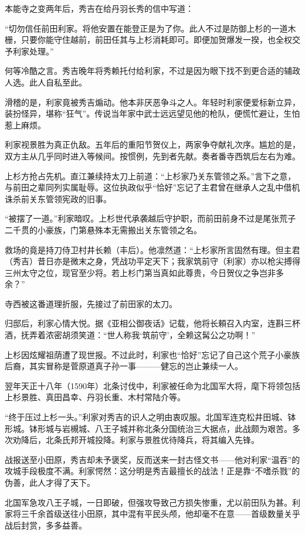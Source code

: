 \documentclass[
]{article}
\begin{document}
本能寺之变两年后，秀吉在给丹羽长秀的信中写道：

``切勿信任前田利家。将他安置在能登正是为了你。此人不过是防御上杉的一道木栅，只要你能守住越前，前田任其与上杉消耗即可。即便加贺爆发一揆，也全权交予利家处理。''

何等冷酷之言。秀吉晚年将秀赖托付给利家，不过是因为眼下找不到更合适的辅政人选。此人自私至此。

滑稽的是，利家竟被秀吉煽动。他本非厌恶争斗之人。年轻时利家便爱标新立异，装扮怪异，堪称``狂气''。传说当年家中武士远远望见他的枪队，便慌忙避让，生怕惹上麻烦。

利家视景胜为真正仇敌。五年后的重阳节贺仪上，两家争夺献礼次序。尴尬的是，双方主从几乎同时进入等候间。按惯例，先到者先献。奏者番寺西筑后左右为难。

上杉方抢占先机。直江兼续持太刀上前道：``上杉家乃关东管领之系。''言下之意，与前田之辈同列实属耻辱。这位执政似乎``恰好''忘记了主君曾在继承人之乱中借机诛杀前关东管领宪政的旧事。

``被摆了一道。''利家暗叹。上杉世代承袭越后守护职，而前田前身不过是尾张荒子二千贯的小豪族，门第悬殊本无需搬出关东管领之名。

救场的竟是持刀侍卫村井长赖（丰后）。他凛然道：``上杉家所言固然有理。但主君（秀吉）昔日亦是微末之身，凭战功平定天下；我家筑前守（利家）亦以枪尖搏得三州太守之位，现官至少将。若上杉门第当真如此尊贵，今日贺仪之争岂非多余？''

寺西被这番道理折服，先接过了前田家的太刀。

归邸后，利家心情大悦。据《亚相公御夜话》记载，他将长頼召入内室，连斟三杯酒，抚弄着浓密胡须笑道：``世人称我`筑前守'，全赖这髯公之功啊！''

上杉因炫耀祖荫遭了现世报。不过此时，利家也``恰好''忘记了自己这个荒子小豪族后裔，其实冒称是菅原道真子孙一事---------健忘的岂止兼续一人。

翌年天正十八年（1590年）北条讨伐中，利家被任命为北国军大将，麾下将领包括上杉景胜、真田昌幸、丹羽长重、木村常陆介等。

``终于压过上杉一头。''利家对秀吉的识人之明由衷叹服。北国军连克松井田城、钵形城。钵形城与岩槻城、八王子城并称北条分国统治三大据点，此战颇为艰苦。多次劝降后，北条氏邦开城投降。利家与景胜优待降兵，将其编入先锋。

战报送至小田原，秀吉却未予褒奖，反而送来一封古怪文书------他对利家``温吞''的攻城手段极度不满。利家愕然：这分明是秀吉最擅长的战法！正是靠``不嗜杀戮''的伪善，此人才得了天下。

北国军急攻八王子城，一日即破，但强攻导致己方损失惨重，尤以前田队为甚。利家将三千余首级送往小田原，其中混有平民头颅，他却毫不在意------首级数量关乎战后封赏，多多益善。
\end{document}
